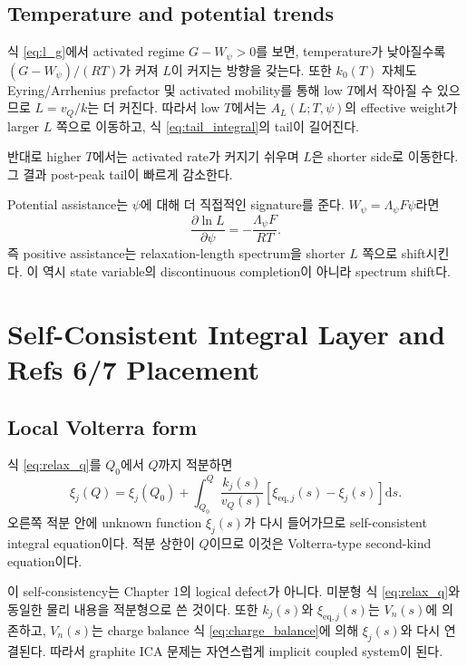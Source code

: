 \documentclass[11pt]{article}
\newcommand{\dd}{\mathrm{d}}
\newcommand{\eq}{\mathrm{eq}}
\begin{document}
\subsection{Temperature and potential trends}\label{subsec:t_potential_trend}

식 \eqref{eq:l_g}에서 activated regime \(G-W_\psi>0\)를 보면, temperature가 낮아질수록
\((G-W_\psi)/(RT)\)가 커져 \(L\)이 커지는 방향을 갖는다. 또한 \(k_0(T)\) 자체도 Eyring/Arrhenius
prefactor 및 activated mobility를 통해 low \(T\)에서 작아질 수 있으므로 \(L=v_Q/k\)는 더 커진다.
따라서 low \(T\)에서는 \(A_L(L;T,\psi)\)의 effective weight가 larger \(L\) 쪽으로 이동하고,
식 \eqref{eq:tail_integral}의 tail이 길어진다.

반대로 higher \(T\)에서는 activated rate가 커지기 쉬우며 \(L\)은 shorter side로 이동한다. 그 결과
post-peak tail이 빠르게 감소한다.

Potential assistance는 \(\psi\)에 대해 더 직접적인 signature를 준다. \(W_\psi=\Lambda_\psi F\psi\)라면
\begin{equation}
\frac{\partial \ln L}{\partial \psi}
=
-
\frac{\Lambda_\psi F}{RT}.
\label{eq:dlnl_dpsi}
\end{equation}
즉 positive assistance는 relaxation-length spectrum을 shorter \(L\) 쪽으로 shift시킨다. 이 역시
state variable의 discontinuous completion이 아니라 spectrum shift다.

\section{Self-Consistent Integral Layer and Refs 6/7 Placement}\label{sec:self_consistent}

\subsection{Local Volterra form}\label{subsec:volterra}

식 \eqref{eq:relax_q}를 \(Q_0\)에서 \(Q\)까지 적분하면
\begin{equation}
\xi_j(Q)
=
\xi_j(Q_0)
+
\int_{Q_0}^{Q}
\frac{k_j(s)}{v_Q(s)}
\left[
\xi_{\eq,j}(s)-\xi_j(s)
\right]
\dd s.
\label{eq:volterra_q}
\end{equation}
오른쪽 적분 안에 unknown function \(\xi_j(s)\)가 다시 들어가므로 self-consistent integral
equation이다. 적분 상한이 \(Q\)이므로 이것은 Volterra-type second-kind equation이다.

이 self-consistency는 Chapter 1의 logical defect가 아니다. 미분형 식 \eqref{eq:relax_q}와 동일한
물리 내용을 적분형으로 쓴 것이다. 또한 \(k_j(s)\)와 \(\xi_{\eq,j}(s)\)는 \(V_n(s)\)에 의존하고,
\(V_n(s)\)는 charge balance 식 \eqref{eq:charge_balance}에 의해 \(\xi_j(s)\)와 다시 연결된다.
따라서 graphite ICA 문제는 자연스럽게 implicit coupled system이 된다.
\end{document}
